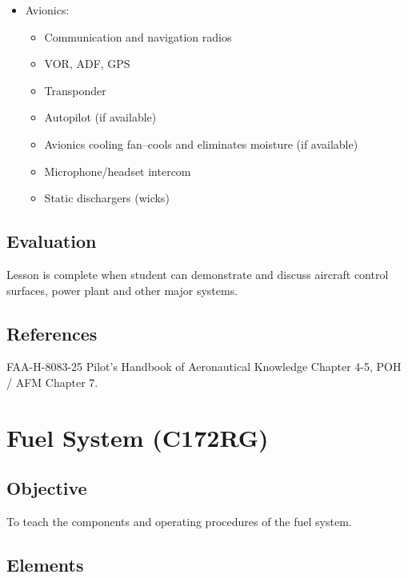 \documentclass[twoside,openright]{report}
\begin{document}
\begin{itemize}
  \item Avionics:
    \begin{itemize}
      \item Communication and navigation radios

      \item VOR, ADF, GPS

      \item Transponder

      \item Autopilot (if available)

      \item Avionics cooling fan--cools and eliminates moisture (if available)

      \item Microphone/headset intercom

      \item Static dischargers (wicks)
    \end{itemize}
\end{itemize}

\section{Evaluation}

Lesson is complete when student can demonstrate and discuss aircraft control
surfaces, power plant and other major systems.

\section{References}

FAA-H-8083-25 Pilot's Handbook of Aeronautical Knowledge Chapter 4-5, POH / AFM
Chapter 7.

\chapter{Fuel System (C172RG)}

\section{Objective}

To teach the components and operating procedures of the fuel system.

\section{Elements}
\end{document}
